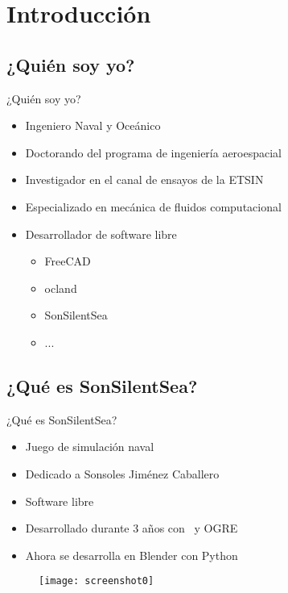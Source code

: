 \section{Introducción} 

\subsection{¿Quién soy yo?}
\begin{frame}{¿Quién soy yo?}
	\begin{itemize}
		\item Ingeniero Naval y Oceánico
		\item Doctorando del programa de ingeniería aeroespacial
		\item Investigador en el canal de ensayos de la ETSIN
		\item Especializado en mecánica de fluidos computacional
		\item Desarrollador de software libre
		\begin{itemize}
			\item FreeCAD
			\item ocland
			\item SonSilentSea
			\item ...
		\end{itemize}	
	\end{itemize}
\end{frame}

\subsection{¿Qué es SonSilentSea?}
\begin{frame}{¿Qué es SonSilentSea?}
	\begin{itemize}
		\item Juego de simulación naval
		\item Dedicado a Sonsoles Jiménez Caballero
		\item Software libre
		\item Desarrollado durante 3 años con \CC $\,$ y OGRE
		\item Ahora se desarrolla en Blender con Python
	\end{itemize}
	\begin{figure}
		\texttt{[image: screenshot0]} 
	\end{figure}
\end{frame}

